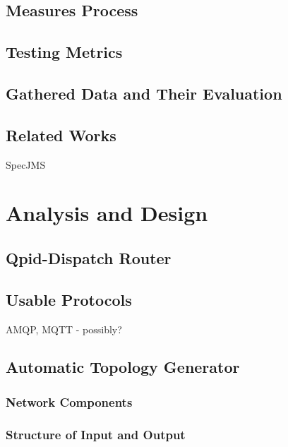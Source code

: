 \section{Measures Process}
\label{Measures Process}

\section{Testing Metrics}
\label{Testing Metrics}

\section{Gathered Data and Their Evaluation}
\label{Gathered Data and Their Evaluation}

\section{Related Works}
\label{Related Works}

SpecJMS

\chapter{Analysis and Design}
\label{Analysis and Design}

\section{Qpid-Dispatch Router}

\section{Usable Protocols}
AMQP, MQTT - possibly?

\section{Automatic Topology Generator}

\subsection{Network Components}

\subsection{Structure of Input and Output}

